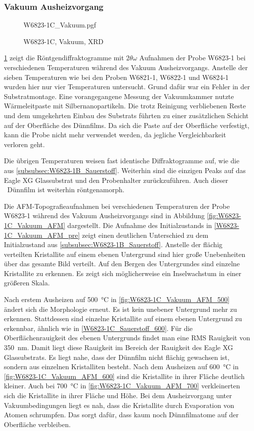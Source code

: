 \subsubsection{Vakuum Ausheizvorgang}\label{subsubsec:W6823-1B_Vakuum}
\begin{figure}
    \centering
    {W6823-1C_Vakuum.pgf}
    \caption{W6823-1C, Vakuum, XRD}
    \label{fig:W6823-1C_Vakuum_XRD}
\end{figure}
\cref{fig:W6823-1C_Vakuum_XRD} zeigt die Röntgendiffraktogramme mit $2\theta\omega$ Aufnahmen der Probe W6823-1 bei
verschiedenen Temperaturen während des Vakuum Ausheizvorgangs.
Anstelle der sieben Temperaturen wie bei den Proben W6821-1, W6822-1 und W6824-1 wurden hier nur vier Temperaturen
untersucht.
Grund dafür war ein Fehler in der Substratmontage.
Eine vorangegangene Messung der Vakuumkammer nutzte Wärmeleitpaste mit Silbernanopartikeln.
Die trotz Reinigung verbliebenen Reste und dem umgekehrten Einbau des Substrats führten zu einer zusätzlichen
Schicht auf der Oberfläche des Dünnfilms.
Da sich die Paste auf der Oberfläche verfestigt, kann die Probe nicht mehr verwendet werden, da jegliche
Vergleichbarkeit verloren geht.

Die übrigen Temperaturen weisen fast identische Diffraktogramme auf, wie die aus \cref{subsubsec:W6823-1B_Sauerstoff}.
Weiterhin sind die einzigen Peaks auf das Eagle XG Glassubstrat und den Probenhalter zurückzuführen.
Auch dieser \heo\ Dünnfilm ist weiterhin röntgenamorph.

Die AFM-Topografieaufnahmen bei verschiedenen Temperaturen der Probe W6823-1 während des Vakuum Ausheizvorgangs sind
in Abbildung \cref{fig:W6823-1C_Vakuum_AFM} dargestellt.
Die Aufnahme des Initialzustands in \cref{W6823-1C_Vakuum_AFM_pre} zeigt einen deutlichen Unterschied zu dem
Initialzustand aus \cref{subsubsec:W6823-1B_Sauerstoff}.
Anstelle der flächig verteilten Kristallite auf einem ebenen Untergrund sind hier große Unebenheiten
über das gesamte Bild verteilt.
Auf den Bergen des Untergrundes sind einzelne Kristallite zu erkennen.
Es zeigt sich möglicherweise ein Inselwachstum in einer größeren Skala.

Nach erstem Ausheizen auf \qty{500}{\degreeCelsius} in \cref{fig:W6823-1C_Vakuum_AFM_500} ändert sich die Morphologie
erneut.
Es ist kein unebener Untergrund mehr zu erkennen.
Stattdessen sind einzelne Kristallite auf einem ebenen Untergrund zu erkennbar, ähnlich wie in
\cref{W6823-1C_Sauerstoff_600}.
Für die Oberflächenrauigkeit des ebenen Untergrunds findet man eine RMS Rauigkeit von \qty{350}{\nano\meter}.
Damit liegt diese Rauigkeit im Bereich der Rauigkeit des Eagle XG Glassubstrats.
Es liegt nahe, dass der Dünnfilm nicht flächig gewachsen ist, sondern aus einzelnen Kristalliten besteht.
Nach dem Ausheizen auf \qty{600}{\degreeCelsius} in \cref{fig:W6823-1C_Vakuum_AFM_600} sind die Kristallite in ihrer
Fläche deutlich kleiner.
Auch bei \qty{700}{\degreeCelsius} in \cref{fig:W6823-1C_Vakuum_AFM_700} verkleinerten sich die Kristallite
in ihrer Fläche und Höhe.
Bei dem Ausheizvorgang unter Vakuumbedingungen liegt es nah, dass die Kristallite durch Evaporation von Atomen
schrumpfen.
Das sorgt dafür, dass kaum noch Dünnfilmatome auf der Oberfläche verbleiben.

